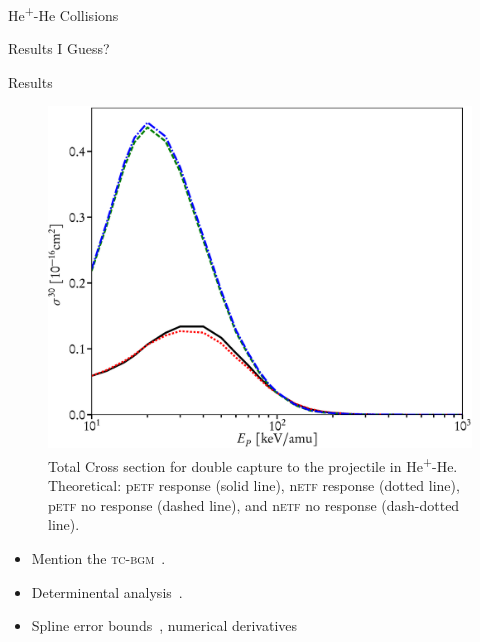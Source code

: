 \documentclass[letterpaper, 11 pt]{report}
\begin{document}
\begin{chapter}{\texorpdfstring{He\textsuperscript{+}}{He+}-He Collisions \label{chap:hephe}}
\begin{section}{Results I Guess? \label{sec:hephe-disc}}
\begin{subsection}{Results \label{sec:hephe-res}}
\begin{figure}[t]
\begin{minipage}{.49\linewidth}
               \centering
               \includegraphics[width = \linewidth]{./images/hephe-cross/HepHe-030.eps}
               \caption[Total Cross section for double capture to the projectile in
                        He\textsuperscript{+}-He]
                       {Total Cross section for double capture to the projectile in
                        He\textsuperscript{+}-He.
                        Theoretical: p\textsc{etf} response (solid line), n\textsc{etf} response (dotted
                                  line),
                                  p\textsc{etf} no response (dashed line), and n\textsc{etf} no response
                                  (dash-dotted line). \label{fig:cs030}}
            \end{minipage}
         \end{figure}

      \end{subsection}

   \end{section}

   \begin{itemize}

      \item Mention the \textsc{tc-bgm}~\cite{tcbgm}.

      \item Determinental analysis~\cite{inc-prob}.

      \item Spline error bounds~\cite{spline-err}, numerical derivatives~\cite{numdiff1, numdiff2}
      

\end{itemize}
\end{chapter}
\end{document}
